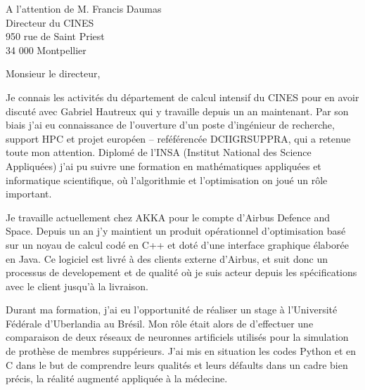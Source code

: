 \documentclass[10pt,a4paper]{lettre}
\begin{document}
\begin{letter}{A l'attention de M. Francis Daumas\\Directeur du CINES\\950 rue de Saint Priest\\34 000 Montpellier}
\address{Victor Cameo Ponz\\16 rue Peyras\\31000 Toulouse}
\nofax

\opening{Monsieur le directeur,}

{
Je connais les activités du département de calcul intensif du CINES pour en
avoir discuté avec Gabriel Hautreux qui y travaille depuis un an
maintenant.
Par son biais j'ai eu connaissance de l'ouverture d'un poste d'ingénieur de recherche,
support HPC et projet européen -- reféférencée DCIIGRSUPPRA,
qui a retenue toute mon attention.
Diplomé de l'INSA (Institut National des Science Appliquées) j'ai pu suivre
une formation en mathématiques appliquées et informatique scientifique, où
l'algorithmie et l'optimisation on joué un rôle important. %
}

{
Je travaille
actuellement chez AKKA pour le compte d'Airbus Defence and Space.
Depuis un an j'y maintient un produit opérationnel d'optimisation
basé sur un noyau de calcul codé en C++ et doté d'une interface graphique élaborée en Java.
Ce logiciel est livré à des clients externe d'Airbus, et suit donc un
processus de developement et de qualité où
je suis acteur depuis les spécifications avec le client jusqu'à la livraison.


Durant ma formation, j'ai eu l'opportunité de réaliser un stage à
l'Université Fédérale d'Uberlandia au Brésil.
Mon rôle était alors de d'effectuer une comparaison de deux réseaux de neuronnes artificiels utilisés pour la simulation de prothèse de membres suppérieurs.
J'ai mis en situation les codes Python et en C dans le but de comprendre leurs
qualités et leurs défaults dans un cadre bien précis, la réalité augmenté
appliquée à la médecine. %

}
\end{letter}
\end{document}
